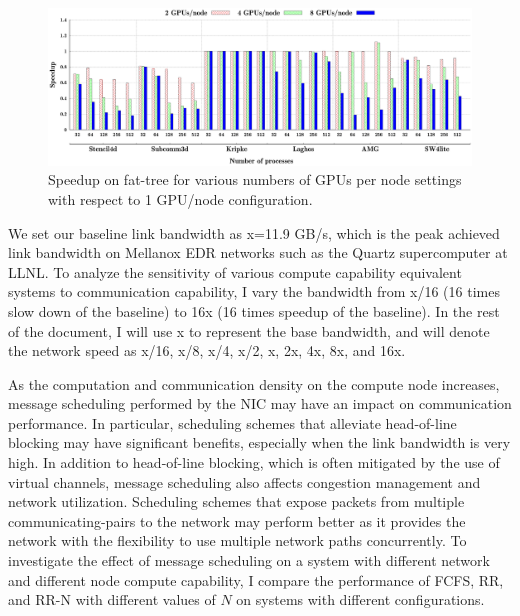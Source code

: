 \begin{figure}[t]
\centering
\includegraphics[width=\textwidth]{plots/ftree/map/ftree-mapping-all.eps}
\caption{Speedup on fat-tree for various numbers of GPUs per node settings with
respect to 1 GPU/node configuration.}
\label{fig:ftree_gpu}
\end{figure}

\vspace{0.08in}
We set our baseline link bandwidth as x=11.9 GB/s, which is the peak achieved
link bandwidth on Mellanox EDR networks such as
the Quartz supercomputer at LLNL. To analyze the
sensitivity of various compute capability equivalent systems to communication capability, I vary the bandwidth
from x/16 (16 times slow down of the baseline) to 16x (16 times speedup of the
baseline). In the rest of the document, I will use x to represent the base
bandwidth, and will denote the network speed as x/16, x/8, x/4, x/2, x, 2x, 4x,
8x, and 16x.  


\vspace{0.08in}
As the computation and communication density
on the compute node increases, message scheduling performed by the
NIC may have an impact on
communication performance. In particular, scheduling schemes that alleviate
head-of-line blocking may have significant benefits, especially when the link
bandwidth is very high. In addition to head-of-line blocking, which is often mitigated
by the use of virtual channels, message scheduling also affects congestion management and network
utilization. Scheduling schemes that expose packets from multiple communicating-pairs
to the network may perform better as it provides the network with the flexibility to
use multiple network paths concurrently. To investigate the effect of message scheduling
on a system with different network and different node compute capability, I compare the performance
of FCFS, RR, and RR-N with different values of $N$ on systems with different configurations. 

